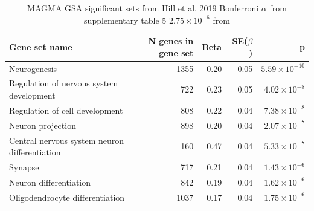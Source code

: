 \begin{table}[ht]
\centering
\begin{tabular}{lrrrr}
  \hline
Gene set name & N genes in gene set & Beta & SE($\beta$) & p \\ 
  \hline
Neurogenesis  & 1355 & 0.20 & 0.05 & $5.59 \times 10^{-10}$ \\ 
  Regulation of nervous system development  & 722 & 0.23 & 0.05 & $4.02 \times 10^{-8}$ \\ 
  Regulation of cell development  & 808 & 0.22 & 0.04 & $7.38 \times 10^{-8}$ \\ 
  Neuron projection  & 898 & 0.20 & 0.04 & $2.07 \times 10^{-7}$ \\ 
  Central nervous system neuron differentiation  & 160 & 0.47 & 0.04 & $5.33 \times 10^{-7}$ \\ 
  Synapse  & 717 & 0.21 & 0.04 & $1.43 \times 10^{-6}$ \\ 
  Neuron differentiation  & 842 & 0.19 & 0.04 & $1.62 \times 10^{-6}$ \\ 
  Oligodendrocyte differentiation  & 1037 & 0.17 & 0.04 & $1.75 \times 10^{-6}$ \\ 
   \hline
\end{tabular}
\caption{MAGMA GSA significant sets from Hill et al. 2019 Bonferroni $\alpha$ from supplementary table 5 $2.75\times10^{-6}$ from \cite{hill2019combined}}
\label{tab:MAGMA GSA results from Hill et al.}
\end{table}


